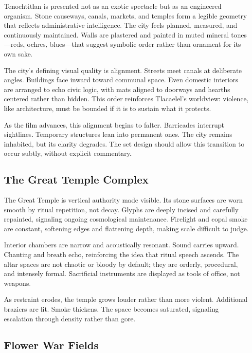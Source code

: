 \documentclass[12pt]{article}
\begin{document}
Tenochtitlan is presented not as an exotic spectacle but as an engineered organism. Stone causeways, canals, markets, and temples form a legible geometry that reflects administrative intelligence. The city feels planned, measured, and continuously maintained. Walls are plastered and painted in muted mineral tones—reds, ochres, blues—that suggest symbolic order rather than ornament for its own sake.

The city's defining visual quality is alignment. Streets meet canals at deliberate angles. Buildings face inward toward communal space. Even domestic interiors are arranged to echo civic logic, with mats aligned to doorways and hearths centered rather than hidden. This order reinforces Tlacaelel's worldview: violence, like architecture, must be bounded if it is to sustain what it protects.

As the film advances, this alignment begins to falter. Barricades interrupt sightlines. Temporary structures lean into permanent ones. The city remains inhabited, but its clarity degrades. The set design should allow this transition to occur subtly, without explicit commentary.

\subsection*{The Great Temple Complex}

The Great Temple is vertical authority made visible. Its stone surfaces are worn smooth by ritual repetition, not decay. Glyphs are deeply incised and carefully repainted, signaling ongoing cosmological maintenance. Firelight and copal smoke are constant, softening edges and flattening depth, making scale difficult to judge.

Interior chambers are narrow and acoustically resonant. Sound carries upward. Chanting and breath echo, reinforcing the idea that ritual speech ascends. The altar spaces are not chaotic or bloody by default; they are orderly, procedural, and intensely formal. Sacrificial instruments are displayed as tools of office, not weapons.

As restraint erodes, the temple grows louder rather than more violent. Additional braziers are lit. Smoke thickens. The space becomes saturated, signaling escalation through density rather than gore.

\subsection*{Flower War Fields}
\end{document}
